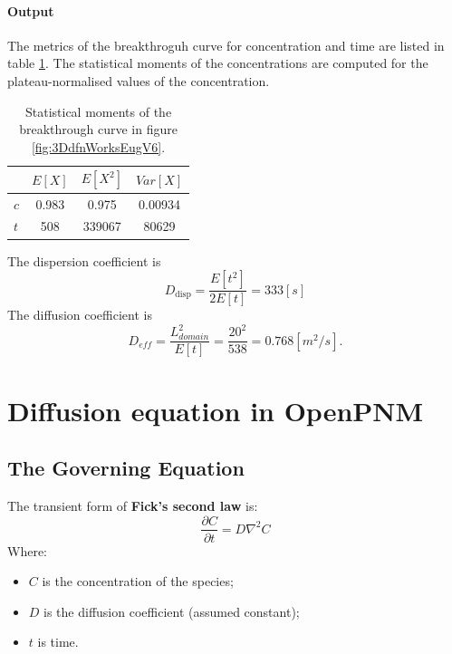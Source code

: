 \documentclass{article}
\begin{document}
\FloatBarrier  %
\paragraph{Output} The metrics of the breakthroguh curve for concentration and time are listed in table \ref{tab:StatMomV6}. The statistical moments of the concentrations are computed for the plateau-normalised values of the concentration.
\begin{table}[h!]
\centering
\begin{tabular}{lccc}
\toprule
        & $ E[X]$ & $E[X^2]$ & $Var[X]$ \\
\midrule
$c$     & 0.983        & 0.975           & 0.00934           \\
$t$     & 508          & 339067          & 80629             \\
\bottomrule
\end{tabular}
\caption{Statistical moments of the breakthrough curve in figure \ref{fig:3DdfnWorksEugV6}.}
\label{tab:StatMomV6}
\end{table}

The dispersion coefficient is
\[ D_{\text{disp}} = \frac{E[t^2]}{2 E[t]} = 333 [s] \]
The diffusion coefficient is
\[ D_{eff} = \frac{L_{domain}^2}{E[t]} = \frac{20^2}{538} = 0.768 [m^2/s]. \]

\FloatBarrier  %
\section{Diffusion equation in OpenPNM}

\subsection{The Governing Equation}
The transient form of \textbf{Fick's second law} is:
\begin{equation}
    \frac{\partial C}{\partial t} = D \nabla^2 C
\end{equation}
Where:
\begin{itemize}
    \item $C$ is the concentration of the species;
    \item $D$ is the diffusion coefficient (assumed constant);
    \item $t$ is time.
\end{itemize}
\end{document}

